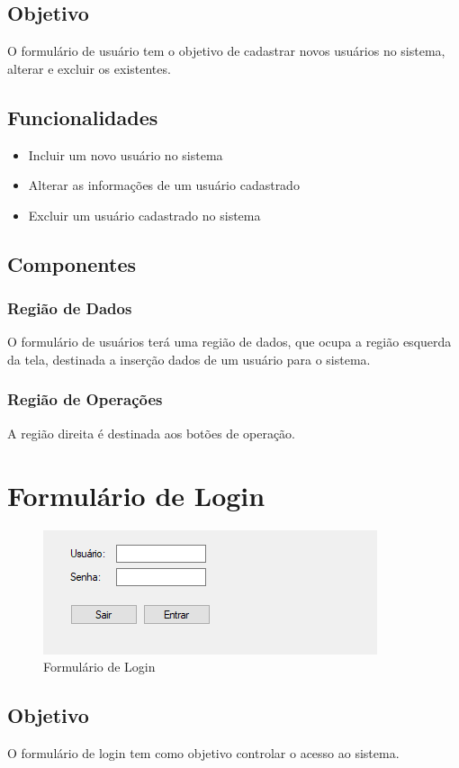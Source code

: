 \documentclass[
	article,			%
	12pt,				%
	oneside,			%
	a4paper,			%
	english,			%
	brazil,				%
	sumario=tradicional
	]{abntex2}
\begin{document}
		\subsection{Objetivo}
		O formulário de usuário tem o objetivo de cadastrar novos usuários no sistema, alterar e excluir os existentes.
		\subsection{Funcionalidades}
			\begin{itemize}
				\item Incluir um novo usuário no sistema
				\item Alterar as informações de um usuário cadastrado
				\item Excluir um usuário cadastrado no sistema
			\end{itemize}
		\subsection{Componentes}		
			\subsubsection{Região de Dados}
			O formulário de usuários terá uma região de dados, que ocupa a região esquerda da tela, destinada a inserção dados de um usuário para o sistema.
			\subsubsection{Região de Operações}
			A região direita é destinada aos botões de operação.
	\newpage
	\section{Formulário de Login}
		\begin{figure}[!htb]
			\centering
			\includegraphics[scale=1.4]{./Figuras/FrmLogin.png}
			\caption{Formulário de Login}
		\end{figure}
		\subsection{Objetivo}
		O formulário de login tem como objetivo controlar o acesso ao sistema.
		
\end{document}
